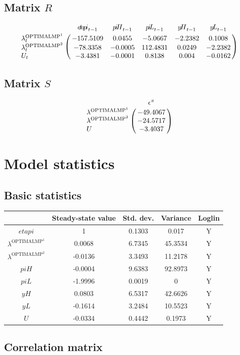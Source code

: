 \subsection*{Matrix $R$}

$$\bordermatrix{
~ & {e\!t\!a\!p\!i}_{t-1} & {p\!i\!H}_{t-1} & {p\!i\!L}_{t-1} & {y\!H}_{t-1} & {y\!L}_{t-1} \cr
\lambda^{\mathrm{OPTIMALMP}^{\mathrm{1}}}_{t} & -157.5109 & 0.0455 & -5.0667 & -2.2382 & 0.1008 \cr
\lambda^{\mathrm{OPTIMALMP}^{\mathrm{2}}}_{t} & -78.3358 & -0.0005 & 112.4831 & 0.0249 & -2.2382 \cr
U_{t} & -3.4381 & -0.0001 & 0.8138 & 0.004 & -0.0162 \cr
}$$

\subsection*{Matrix $S$}

$$\bordermatrix{
~ & \epsilon^{\pi} \cr
\lambda^{\mathrm{OPTIMALMP}^{\mathrm{1}}} & -49.4067 \cr
\lambda^{\mathrm{OPTIMALMP}^{\mathrm{2}}} & -24.5717 \cr
U & -3.4037 \cr
}$$


\section{Model statistics}

\subsection{Basic statistics}

\begin{tabular}{c|c|c|c|c|}
  & Steady-state value & Std. dev. & Variance & Loglin\\
\hline
${e\!t\!a\!p\!i}$ & 1 & 0.1303 & 0.017 & Y    \\
$\lambda^{\mathrm{OPTIMALMP}^{\mathrm{1}}}$ & 0.0068 & 6.7345 & 45.3534 & Y    \\
$\lambda^{\mathrm{OPTIMALMP}^{\mathrm{2}}}$ & -0.0136 & 3.3493 & 11.2178 & Y    \\
${p\!i\!H}$ & -0.0004 & 9.6383 & 92.8973 & Y    \\
${p\!i\!L}$ & -1.9996 & 0.0019 & 0 & Y    \\
${y\!H}$ & 0.0803 & 6.5317 & 42.6626 & Y    \\
${y\!L}$ & -0.1614 & 3.2484 & 10.5523 & Y    \\
$U$ & -0.0334 & 0.4442 & 0.1973 & Y    \\
\hline
\end{tabular}


\subsection{Correlation matrix}

